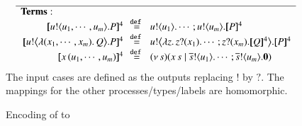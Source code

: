 \begin{figure}[t]
\[\begin{array}{rcl}
\hline
{\bf Terms:}\hspace{2.5cm}\\
		\map{\bout{u}{u_1, \cdots, u_m} P}^{4}
		&\!\!\defeq\!\!&
		\bout{u}{u_1} \cdots ;  \bout{u}{u_m} \map{P}^{4}
		\\
		\map{\bbout{u}{\abs{(x_1, \cdots, x_m)} Q} P}^{4}
		&\!\!\defeq\!\!&
		\bbout{u}{\abs{z}\binp{z}{x_1}\cdots ; \binp{z}{x_m} \map{Q}^{4}} \map{P}^{4}
		\\ 
		\map{\appl{x}{(u_1, \cdots, u_m)}}^{4}
		&\!\!\defeq\!\!&
		\newsp{s}{\appl{x}{s} \Par \bout{\dual{s}}{u_1} \cdots ; \bout{\dual{s}}{u_m} \inact} 
        \\ 
	\end{array}
\]
The input cases are defined as the outputs replacing $!$ by $?$. 
The mappings for the other processes/types/labels are 
homomorphic. 
\caption{\label{f:enc:poltomon}
Encoding of \PHOp to \HOp
}
\Hline 
\end{figure}


 
 










